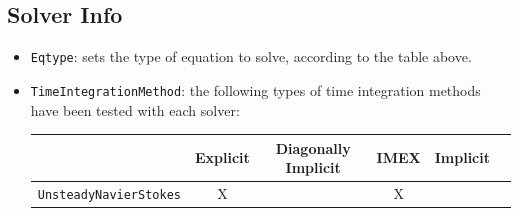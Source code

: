 \subsection{Solver Info}

\begin{itemize}
\item \texttt{Eqtype}:  sets the type of equation to solve, according to the table above.
\item \texttt{TimeIntegrationMethod}: the following types of time integration methods have been tested with each solver:
\begin{table}
\begin{center}
\begin{tabular}{|l|c|c|c|c|c|} \hline
{} & {Explicit} &{Diagonally Implicit} &{IMEX} & {Implicit} \\ \hline
\texttt{UnsteadyNavierStokes} & X & &X & \\ \hline
\end{tabular}
\end{center}
\end{table}
\end{itemize}

